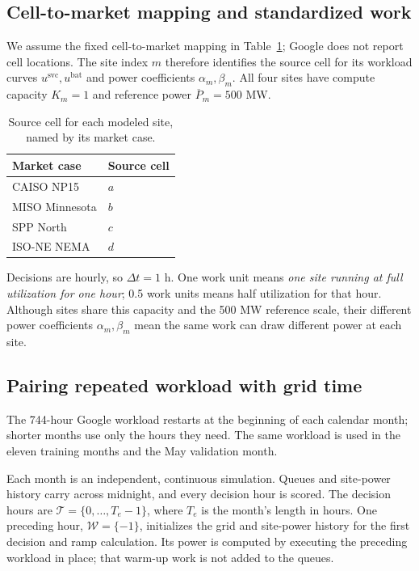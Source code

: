 \documentclass[conference]{IEEEtran}
\begin{document}
\subsection{Cell-to-market mapping and standardized work}
\label{subsec:transform-mapping}

We assume the fixed cell-to-market mapping in
Table~\ref{tab:active-market-map}; Google does not report cell locations.
The site index \(m\) therefore identifies the source cell for its workload
curves \(u^{\mathrm{svc}},u^{\mathrm{bat}}\) and power coefficients
\(\alpha_m,\beta_m\). All four sites have compute capacity \(K_m=1\) and
reference power \(\overline P_m=500\) MW.

\begin{table}[htbp]
  \centering
  \footnotesize
  \caption{Source cell for each modeled site, named by its market case.}
  \label{tab:active-market-map}
  \begin{tabular}{@{}ll@{}}
    \toprule
    Market case & Source cell \\
    \midrule
    CAISO NP15     & \(a\) \\
    MISO Minnesota & \(b\) \\
    SPP North      & \(c\) \\
    ISO-NE NEMA    & \(d\) \\
    \bottomrule
  \end{tabular}
\end{table}

Decisions are hourly, so \(\Delta t=1\) h. One work unit means
\emph{one site running at full utilization for one hour}; 0.5 work units
means half utilization for that hour. Although sites share this capacity and
the 500 MW reference scale, their different power coefficients
\(\alpha_m,\beta_m\) mean the same work can draw different power at each site.

\subsection{Pairing repeated workload with grid time}
\label{subsec:transform-pairing}

The 744-hour Google workload restarts at the beginning of each calendar
month; shorter months use only the hours they need. The same workload is
used in the eleven training months and the May validation month.

Each month is an independent, continuous simulation. Queues and site-power
history carry across midnight, and every decision hour is scored. The
decision hours are \(\mathcal T=\{0,\ldots,T_e-1\}\), where \(T_e\) is the
month's length in hours. One preceding hour,
\(\mathcal W=\{-1\}\), initializes the grid and site-power history for the
first decision and ramp calculation.
Its power is computed by executing the preceding workload in place;
that warm-up work is not added to the queues.
\end{document}
